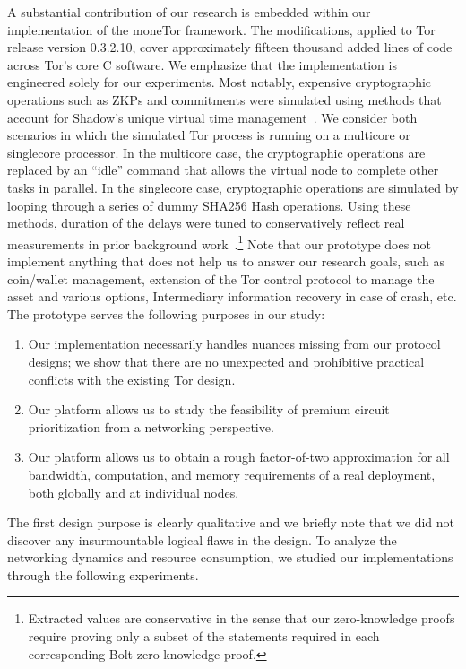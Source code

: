 A substantial contribution of our research is embedded within our implementation
of the moneTor framework. The modifications, applied to Tor release version
0.3.2.10, cover approximately fifteen thousand added lines of code across Tor's
core C software. We emphasize that the implementation is engineered solely for
our experiments. Most notably, expensive cryptographic operations such as ZKPs
and commitments were simulated using methods that account for Shadow's unique
virtual time management~\cite{jansen2011shadow}. We consider both scenarios in
which the simulated Tor process is running on a multicore or singlecore
processor. In the multicore case, the cryptographic operations are replaced by
an ``idle'' command that allows the virtual node to complete other tasks in
parallel. In the singlecore case, cryptographic operations are simulated by
looping through a series of dummy SHA256 Hash operations.
Using these methods, duration of the delays were tuned to conservatively reflect
real measurements in prior background
work~\cite{green2017bolt}.\footnote{Extracted values are conservative in the
  sense that our zero-knowledge proofs require proving only a subset of the
  statements required in each corresponding Bolt zero-knowledge proof.} Note
that our prototype does not implement anything that does not help us to answer
our research goals, such as coin/wallet management, extension of the Tor control
protocol to manage the asset and various options, Intermediary information
recovery in case of crash, etc. The prototype serves the following purposes in
our study:
\begin{enumerate}
\item Our implementation necessarily handles nuances missing from
  our protocol designs; we show that there are no unexpected and
  prohibitive practical conflicts with the existing Tor design.
\item Our platform allows us to study the feasibility of premium circuit prioritization from
  a networking perspective.
\item Our platform allows us to obtain a rough factor-of-two approximation for all
  bandwidth, computation, and memory requirements of a real deployment, both globally
  and at individual nodes.
\end{enumerate}

The first design purpose is clearly qualitative and we briefly note that we did
not discover any insurmountable logical flaws in the design. To analyze the
networking dynamics and resource consumption, we studied our implementations
through the following experiments.

